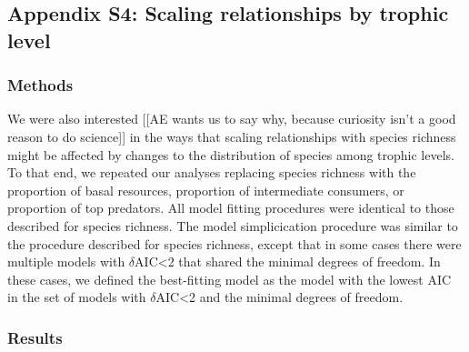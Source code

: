 \documentclass[12pt]{article}
\begin{document}


\subsection*{Appendix S4: Scaling relationships by trophic level}

  \subsubsection*{Methods}

    We were also interested [[AE wants us to say why, because curiosity isn't a good reason to do science]] 
    in the ways that scaling relationships with species richness might
    be affected by changes to the distribution of species among trophic levels. To
    that end, we repeated our analyses replacing species richness with the
    proportion of basal resources, proportion of intermediate consumers,
    or proportion of top predators. All model fitting procedures were identical to those
    described for species richness. The model simplicication procedure was similar to
    the procedure described for species richness, except that in some cases there were
    multiple models with $\delta$AIC\textless2 that shared the minimal degrees of freedom.
    In these cases, we defined the best-fitting model as the model with the lowest AIC in the
    set of models with $\delta$AIC\textless2 and the minimal degrees of freedom.


  \subsubsection*{Results}
\end{document}
